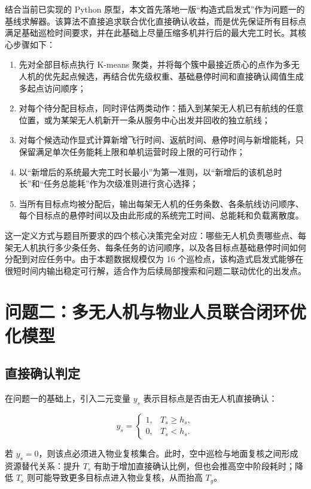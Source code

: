 \documentclass[12pt]{article}
\begin{document}
结合当前已实现的 Python 原型，本文首先落地一版“构造式启发式”作为问题一的基线求解器。该算法不直接追求联合优化直接确认收益，而是优先保证所有目标点满足基础巡检时间要求，并在此基础上尽量压缩多机并行后的最大完工时长。其核心步骤如下：

\begin{enumerate}
	\item 先对全部目标点执行 K-means 聚类，并将每个簇中最接近质心的点作为多无人机的优先起点候选，再结合优先级权重、基础悬停时间和直接确认阈值生成多起点访问顺序；
	\item 对每个待分配目标点，同时评估两类动作：插入到某架无人机已有航线的任意位置，或为某架无人机新开一条从服务中心出发并回收的独立航线；
	\item 对每个候选动作显式计算新增飞行时间、返航时间、悬停时间与新增能耗，只保留满足单次任务能耗上限和单机运营时段上限的可行动作；
	\item 以“新增后的系统最大完工时长最小”为第一准则，以“新增后的该机总时长”和“任务总能耗”作为次级准则进行贪心选择；
	\item 当所有目标点均被分配后，输出每架无人机的任务条数、各条航线访问顺序、每个目标点的悬停时间以及由此形成的系统完工时间、总能耗和负载离散度。
\end{enumerate}

这一定义方式与题目所要求的四个核心决策完全对应：哪些无人机负责哪些点、每架无人机执行多少条任务、每条任务的访问顺序，以及各目标点基础悬停时间如何分配到对应任务中。由于本题数据规模仅为 16 个巡检点，该构造式启发式能够在很短时间内输出稳定可行解，适合作为后续局部搜索和问题二联动优化的出发点。

\section{问题二：多无人机与物业人员联合闭环优化模型}

\subsection{直接确认判定}
在问题一的基础上，引入二元变量 $y_s$ 表示目标点是否由无人机直接确认：

\begin{equation}
y_s =
\begin{cases}
1, & T_s \ge h_s, \\
0, & T_s < h_s.
\end{cases}
\end{equation}

若 $y_s=0$，则该点必须进入物业复核集合。此时，空中巡检与地面复核之间形成资源替代关系：提升 $T_s$ 有助于增加直接确认比例，但也会推高空中阶段耗时；降低 $T_s$ 则可能导致更多目标点进入物业复核，从而抬高 $T_g$。
\end{document}
